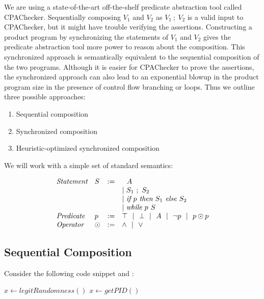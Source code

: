 \documentclass{article}
\begin{document}
We are using a state-of-the-art off-the-shelf predicate abstraction tool called CPAChecker. Sequentially composing $V_1$ and $V_2$ as $V_1\ ;\ V_2$ is a valid input to CPAChecker, but it might have trouble verifying the assertions. Constructing a product program by synchronizing the statements of $V_1$ and $V_2$ gives the predicate abstraction tool more power to reason about the composition. This synchronized approach is semantically equivalent to the sequential composition of the two programs. Although it is easier for CPAChecker to prove the assertions, the synchronized approach can also lead to an exponential blowup in the product program size in the presence of control flow branching or loops. Thus we outline three possible approaches: 

\begin{enumerate}
	\item Sequential composition 
	\item Synchronized composition
	\item Heuristic-optimized synchronized composition
\end{enumerate}

We will work with a simple set of standard semantics:  

\[
	\begin{array}{l l c l}
		\emph{Statement} & S & := & 
			\ \ A \\
			& & & |~ S_1\ ;\ S_2 \\
			& & & |~ \emph{if }p\emph{ then } S_1 \emph{ else } S_2 \\
			& & & |~ \emph{while }p\emph{ } S \\
		\emph{Predicate} & p &:=& \top ~~|~~ \bot ~~|~~ A ~~|~~ \lnot p ~~|~~ p \odot p \\
		\emph{Operator} & \odot &:=& \land ~~|~~ \lor \\
	\end{array}
\]

\subsection{Sequential Composition}

	Consider the following code snippet and : 
	
	\begin{algorithm}[H]
		\begin{algorithmic}
			    \State $x \gets legitRandomness()$
			\Else
			    \State $x \gets getPID()$
			\EndIf
		\end{algorithmic}
	\end{algorithm}
\end{document}
